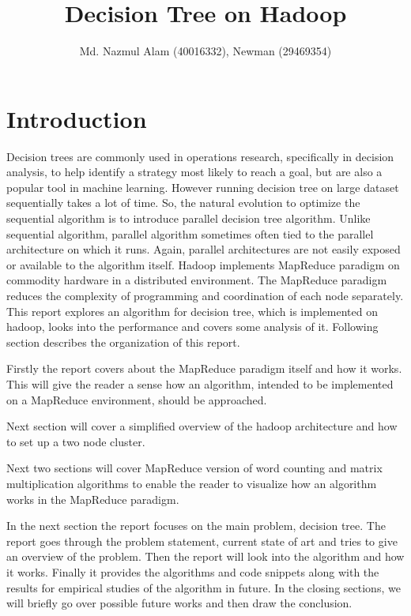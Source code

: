 \documentclass{article}
\title{Decision Tree on Hadoop}
\author{Md. Nazmul Alam (40016332), Newman (29469354)}
\begin{document}
\maketitle
\newpage
\tableofcontents
\listofalgorithms
\lstlistoflistings
{}
\newpage
\section{Introduction}
Decision trees are commonly used in operations research, specifically in decision analysis, to help identify a strategy most likely to reach a goal, but are also a popular tool in machine learning\cite{wikidt}. However running decision tree on large dataset sequentially takes a lot of time. So, the natural evolution to optimize the sequential algorithm is to introduce parallel decision tree algorithm. Unlike sequential algorithm, parallel algorithm sometimes often tied to the parallel architecture on which it runs. Again, parallel architectures are not easily exposed or available to the algorithm itself. Hadoop implements MapReduce paradigm on commodity hardware in a distributed environment. The MapReduce paradigm reduces the complexity of programming and coordination of each node separately.
\BlankLine This report explores an algorithm for decision tree, which is implemented on hadoop, looks into the performance and covers some analysis of it. Following section describes the organization of this report.\BlankLine

Firstly the report covers about the MapReduce paradigm itself and how it works. This will give the reader a sense how an algorithm, intended to be implemented on a MapReduce environment, should be approached.

Next section will cover a simplified overview of the hadoop architecture and how to set up a two node cluster.

Next two sections will cover MapReduce version of word counting and matrix multiplication algorithms to enable the reader to visualize how an algorithm works in the MapReduce paradigm.

In the next section the report focuses on the main problem, decision tree. The report goes through the problem statement, current state of art and tries to give an overview of the problem. Then the report will look into the algorithm and how it works. Finally it provides the algorithms and code snippets along with the results for empirical studies of the algorithm in future.
In the closing sections, we will briefly go over possible future works and then draw the conclusion.
\end{document}
